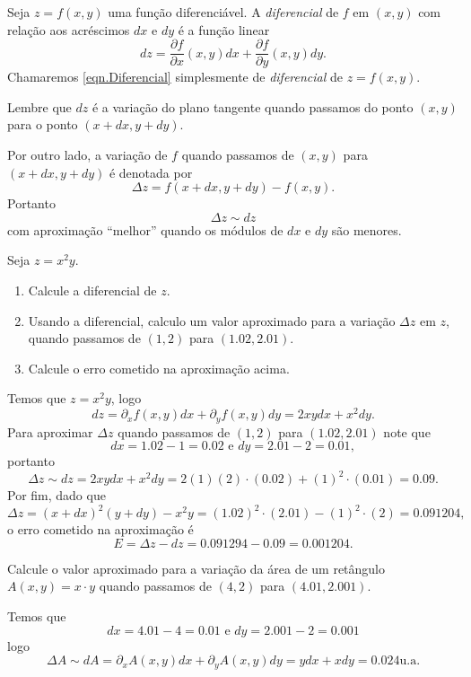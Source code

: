Seja \(z = f(x,y)\) uma função diferenciável. A \textit{diferencial} de \(f\) em \((x,y)\) com relação aos acréscimos \(dx\) e \(dy\) é a função linear
    \begin{equation}\label{eqn.Diferencial}
        dz = \frac{\partial f}{\partial x}(x,y)dx + \frac{\partial f}{\partial y}(x,y)dy.
    \end{equation}
Chamaremos \eqref{eqn.Diferencial} simplesmente de \textit{diferencial} de \(z = f(x,y)\).

Lembre que \(dz\) é a variação do plano tangente quando passamos do ponto \((x,y)\) para o ponto \((x+dx,y+dy)\).

Por outro lado, a variação de \(f\) quando passamos de \((x,y)\) para \((x+dx,y+dy)\) é denotada por \[\Delta z = f(x+dx,y+dy) - f(x,y).\] Portanto \[\Delta z \sim dz\] com aproximação ``melhor'' quando os módulos de \(dx\) e \(dy\) são menores.

\begin{example}
    Seja \(z = x^2 y\).
        \begin{enumerate}
            \item Calcule a diferencial de \(z\).
            \item Usando a diferencial, calculo um valor aproximado para a variação \(\Delta z\) em \(z\), quando passamos de \((1,2)\) para \((1.02,2.01)\).
            \item Calcule o erro cometido na aproximação acima.
        \end{enumerate}

    Temos que \(z = x^2 y\), logo \[dz = \partial_x f(x,y) dx + \partial_y f(x,y) dy = 2xy dx + x^2 dy.\] Para aproximar \(\Delta z\) quando passamos de \((1,2)\) para \((1.02,2.01)\) note que \[dx = 1.02 - 1 = 0.02 \text{ e } dy = 2.01 - 2 = 0.01,\] portanto \[\Delta z \sim dz = 2xy dx + x^2 dy = 2(1)(2)\cdot(0.02) + (1)^2\cdot(0.01) = 0.09.\] Por fim, dado que \[\Delta z = (x+dx)^2(y+dy) - x^2y = (1.02)^2\cdot (2.01) - (1)^2\cdot (2) = 0.091204,\] o erro cometido na aproximação é \[E = \Delta z - dz = 0.091294 - 0.09 = 0.001204.\]
\end{example}

\begin{example}
    Calcule o valor aproximado para a variação da área de um retângulo \(A(x,y) = x\cdot y\) quando passamos de \((4,2)\) para \((4.01,2.001)\).

    Temos que \[dx = 4.01 - 4 = 0.01 \text{ e } dy = 2.001 - 2 = 0.001\] logo \[\Delta A \sim dA = \partial_x A(x,y) dx + \partial_y A(x,y) dy = ydx + xdy = 0.024\text{u.a}.\]
\end{example}

